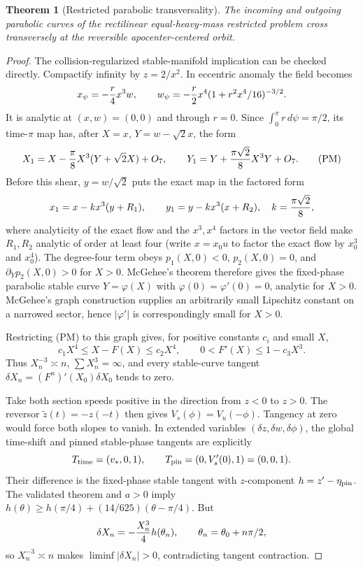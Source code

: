 \documentclass[11pt]{article}
\newtheorem{theorem}{Theorem}
\begin{document}
\begin{theorem}[Restricted parabolic transversality]
The incoming and outgoing parabolic curves of the rectilinear equal-heavy-mass
restricted problem cross transversely at the reversible apocenter-centered
orbit.
\end{theorem}
\begin{proof}
The collision-regularized stable-manifold implication can be checked directly.
Compactify infinity by $z=2/x^2$. In eccentric anomaly the field becomes
\[
x_\psi=-{r\over4}x^3w,\qquad
w_\psi=-{r\over2}x^4(1+r^2x^4/16)^{-3/2}.
\]
It is analytic at $(x,w)=(0,0)$ and through $r=0$. Since
$\int_0^\pi r\,d\psi=\pi/2$, its time-$\pi$ map has, after
$X=x$, $Y=w-\sqrt2x$, the form
\[
X_1=X-\frac\pi8X^3(Y+\sqrt2X)+O_7,\qquad
Y_1=Y+{\pi\sqrt2\over8}X^3Y+O_7.
\tag{PM}
\]
Before this shear, $y=w/\sqrt2$ puts the exact map in the factored form
\[
x_1=x-kx^3(y+R_1),\qquad y_1=y-kx^3(x+R_2),
\quad k={\pi\sqrt2\over8},
\]
where analyticity of the exact flow and the $x^3,x^4$ factors in the vector
field make $R_1,R_2$ analytic of order at least four (write $x=x_0u$ to
factor the exact flow by $x_0^3$ and $x_0^4$).
The degree-four term obeys $p_1(X,0)<0$, $p_2(X,0)=0$, and
$\partial_Yp_2(X,0)>0$ for $X>0$. McGehee's theorem
\cite{McGehee1973} therefore gives the fixed-phase parabolic stable curve
$Y=\varphi(X)$ with $\varphi(0)=\varphi'(0)=0$, analytic for $X>0$.
McGehee's graph construction supplies an arbitrarily small Lipschitz constant
on a narrowed sector, hence $|\varphi'|$ is correspondingly small for $X>0$.

Restricting (PM) to this graph gives, for positive constants $c_i$ and small
$X$,
\[
c_1X^4\le X-F(X)\le c_2X^4,\qquad
0<F'(X)\le1-c_3X^3.
\]
Thus $X_n^{-3}\asymp n$, $\sum X_n^3=\infty$, and every stable-curve tangent
$\delta X_n=(F^n)'(X_0)\delta X_0$ tends to zero.

Take both section speeds positive in the direction from $z<0$ to $z>0$.
The reversor $\widetilde z(t)=-z(-t)$ then gives
$V_s(\phi)=V_u(-\phi)$. Tangency at zero would force both slopes to vanish.
In extended variables $(\delta z,\delta w,\delta\phi)$, the global time-shift
and pinned stable-phase tangents are explicitly
\[
T_{\rm time}=(v_*,0,1),\qquad T_{\rm pin}=(0,V_s'(0),1)=(0,0,1).
\]
Their difference is the fixed-phase stable tangent with $z$-component
$h=z'-\eta_{\rm pin}$. The
validated theorem and $a>0$ imply
$h(\theta)\ge h(\pi/4)+(14/625)(\theta-\pi/4)$. But
\[
\delta X_n=-{X_n^3\over4}h(\theta_n),\qquad
\theta_n=\theta_0+n\pi/2,
\]
so $X_n^{-3}\asymp n$ makes $\liminf|\delta X_n|>0$, contradicting tangent
contraction.
\end{proof}
\end{document}
